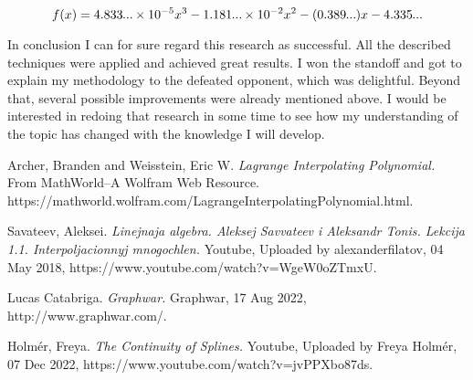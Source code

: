 \documentclass[12pt, titlepage]{article}
\begin{document}
\newcommand\smalldots{\makebox[0.75em][c]{.\hfil.\hfil.}}

$$f(x) = 4.833\smalldots \times 10^{-5} x^3- 1.181\smalldots{} \times 10^{-2} x^2 - (0.389\smalldots{}) x - 4.335\smalldots$$

In conclusion I can for sure regard this research as successful. All the
described techniques were applied and achieved great results. I won the
standoff and got to explain my methodology to the defeated opponent, which
was delightful. Beyond that, several possible improvements were already 
mentioned above. I would be interested in redoing that research in some time
to see how my understanding of the topic has changed with the knowledge I will
develop.

\begin{thebibliography}{1}

Archer, Branden and Weisstein, Eric W. {\em Lagrange Interpolating Polynomial.}
From MathWorld--A Wolfram Web Resource. https://mathworld.wolfram.com/LagrangeInterpolatingPolynomial.html.

Savateev, Aleksei. {\em Linejnaja algebra. Aleksej Savvateev i Aleksandr Tonis. Lekcija 1.1. Interpoljacionnyj mnogochlen.}
Youtube, Uploaded by alexanderfilatov, 04 May 2018, https://www.youtube.com/watch?v=WgeW0oZTmxU.

Lucas Catabriga. {\em Graphwar.} Graphwar, 17 Aug 2022, http://www.graphwar.com/.

Holm\'{e}r, Freya. {\em The Continuity of Splines.}
Youtube, Uploaded by Freya Holm\'{e}r, 07 Dec 2022, https://www.youtube.com/watch?v=jvPPXbo87ds.


\end{thebibliography}
  
\end{document}
